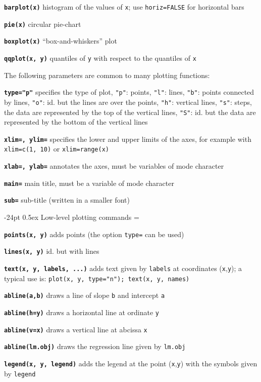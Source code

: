 \documentclass[10pt,landscape]{article}
\makeatletter
\renewcommand\section{\@startsection{section}{1}{0mm}%
                                     {-24pt}%
                                     {0.5ex}%
                                {\color[rgb]{1,0.54902,0}\normalfont\large\bfseries}}
\newcommand{\code}{\texttt}
\newcommand{\bcode}[1]{\texttt{\textbf{#1}}}
\makeatother
\begin{document}
\begin{multicols*}{3}
\bcode{barplot(x)}  histogram of the values of \code{x}; use
\code{horiz=FALSE} for horizontal bars

\bcode{pie(x)}  circular pie-chart

\bcode{boxplot(x)}  ``box-and-whiskers'' plot

\bcode{qqplot(x, y)}  quantiles of \code{y} with respect to the quantiles of \code{x}


The following parameters are common to many plotting functions:

\bcode{type="p"}  specifies the type of plot, \code{"p"}: points, \code{"l"}: lines, \code{"b"}: points connected by lines, \code{"o"}: id. but the lines are over the points, \code{"h"}: vertical lines, \code{"s"}: steps, the data are represented by the top of the vertical lines, \code{"S"}: id. but the data are represented by the bottom of the vertical lines

\bcode{xlim=, ylim=}  specifies the lower and upper limits of the axes, for example with \code{xlim=c(1, 10)} or \code{xlim=range(x)}

\bcode{xlab=, ylab=}  annotates the axes, must be variables of mode character

\bcode{main=}  main title, must be a variable of mode character

\bcode{sub=}  sub-title (written in a smaller font)




\section{Low-level plotting commands}
\everypar={\hangindent=9mm}

\bcode{points(x, y)}  adds points (the option \code{type=} can be used)

\bcode{lines(x, y)}  id. but with lines

\bcode{text(x, y, \mbox{labels}, ...)}  adds text given by \code{labels} at coordinates (\code{x},\code{y}); a typical use is: \code{plot(x, y, type="n"); text(x, y, names)}

\bcode{abline(a,b)}  draws a line of slope \code{b} and intercept \code{a}

\bcode{abline(h=y)}  draws a horizontal line at ordinate \code{y}

\bcode{abline(v=x)}  draws a vertical line at abcissa \code{x}

\bcode{abline(lm.obj)}  draws the regression line given by \code{lm.obj}

\bcode{legend(x, y, legend)}  adds the legend at the point (\code{x},\code{y}) with the symbols given by \code{legend}


\end{multicols*}
\end{document}
